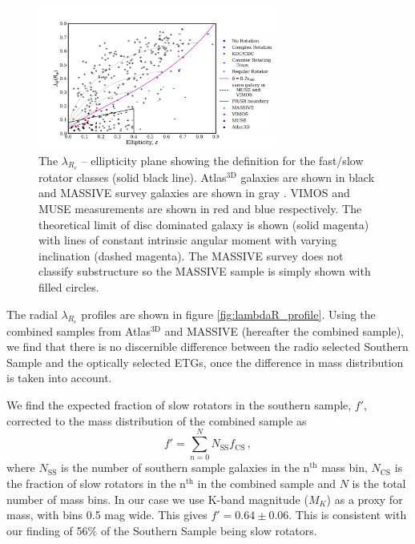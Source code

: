 			\begin{figure}
				\centering
				\includegraphics[width=0.7\textwidth]{chapter4/lambda_R_ellipticity.png}
				\caption[$\lambda_{R_e}$ -- ellipticity plane]{The $\lambda_{R_e}$ -- ellipticity plane showing the definition for the fast/slow rotator classes (solid black line). Atlas$^\text{3D}$ galaxies are shown in black \citep{Emsellem2011} and MASSIVE survey galaxies are shown in gray \citep{Veale2017}. VIMOS and MUSE measurements are shown in red and blue respectively. The theoretical limit of disc dominated galaxy is shown (solid magenta) with lines of constant intrinsic angular moment with varying inclination (dashed magenta). The MASSIVE survey does not classify substructure so the MASSIVE sample is simply shown with filled circles.}
				\label{fig:lambdaR_ellip}
			\end{figure}


			The radial $\lambda_{R_e}$ profiles are shown in figure \ref{fig:lambdaR_profile}. Using the combined samples from Atlas$^\text{3D}$ and MASSIVE (hereafter the combined sample), we find that there is no discernible difference between the radio selected Southern Sample and the optically selected ETGs, once the difference in mass distribution is taken into account. 

			We find the expected fraction of slow rotators in the southern sample, $f'$, corrected to the mass distribution of the combined sample as
			\begin{equation}
				f' = \sum_{n=0}^N N_\mathrm{SS} f_\mathrm{CS}\, , 
			\end{equation}
			where $N_\mathrm{SS}$ is the number of southern sample galaxies in the n$^\mathrm{th}$ mass bin, $N_\mathrm{CS}$ is the fraction of slow rotators in the n$^\mathrm{th}$ in the combined sample and $N$ is the total number of mass bins. In our case we use K-band magnitude ($M_K$) as a proxy for mass, with bins 0.5 mag wide. This gives $f' = 0.64 \pm 0.06$. This is consistent with our finding of 56\% of the Southern Sample being slow rotators.

